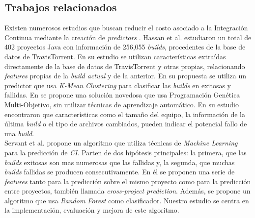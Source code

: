 \subsection{Trabajos relacionados}
Existen numerosos estudios que buscan reducir el costo asociado a la Integración Continua
mediante la creación de \textit{predictors} \cite{7,5,2,15,6,14,4,1,19}. Hassan et al. \cite{7}
estudiaron un total de 402 proyectos Java con información de 256,055 \textit{builds}, procedentes
de la base de datos de TravisTorrent. En su estudio se utilizan características extraídas
directamente de la base de datos de TravisTorrent y otras propias, relacionando \textit{features}
propias de la \textit{build actual} y de la anterior. En su propuesta se utiliza un predictor
que usa \textit{K-Mean Clustering} para clasificar las \textit{builds} en exitosas y fallidas.
En \cite{5} se propone una solución novedosa que usa Programación Genética Multi-Objetivo, sin
utilizar técnicas de aprendizaje automático. En su estudio encontraron que características
como el tamaño del equipo, la información de la última \textit{build} o el tipo de archivos
cambiados, pueden indicar el potencial fallo de una \textit{build}.\\

Servant et al. \cite{2} propone un algoritmo que utiliza técnicas de \textit{Machine Learning}
para la predicción de \textit{CI}. Parten de dos hipótesis principales: la primera, que las
\textit{builds} exitosas son mas numerosas que las fallidas y, la segunda, que muchas
\textit{builds} fallidas se producen consecutivamente. En él se proponen una serie de
\textit{features} tanto para la predicción sobre el mismo proyecto como para la predicción
entre proyectos, también llamada \textit{cross-project prediction}. Además, se propone un
algoritmo que usa \textit{Random Forest} como clasificador. Nuestro estudio se centra en
la implementación, evaluación y mejora de este algoritmo.\\

